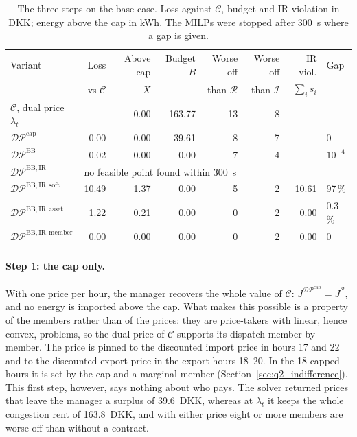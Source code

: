 \begin{table}[htbp]
\centering
\caption{The three steps on the base case. Loss against $\mathcal{C}$, budget and IR violation in DKK; energy above the cap in kWh. The MILPs were stopped after 300~s where a gap is given.}
\label{tab:DP_steps}
\small
\begin{tabular}{@{}lrrrrrrl@{}}
\toprule
Variant & Loss & Above cap & Budget $B$ & Worse off & Worse off & IR viol. & Gap\\
 & vs $\mathcal{C}$ & $X$ & & than $\mathcal{R}$ & than $\mathcal{I}$ & $\sum_is_i$ & \\
\midrule
$\mathcal{C}$, dual price $\lambda_t$ & -- & 0.00 & 163.77 & 13 & 8 & -- & --\\
$\mathcal{DP}^{\mathrm{cap}}$ & 0.00 & 0.00 & 39.61 & 8 & 7 & -- & 0\\
$\mathcal{DP}^{\mathrm{BB}}$ & 0.02 & 0.00 & 0.00 & 7 & 4 & -- & $10^{-4}$\\
$\mathcal{DP}^{\mathrm{BB,IR}}$ & \multicolumn{7}{l}{no feasible point found within 300~s}\\
$\mathcal{DP}^{\mathrm{BB,IR,soft}}$ & 10.49 & 1.37 & 0.00 & 5 & 2 & 10.61 & 97\,\%\\
$\mathcal{DP}^{\mathrm{BB,IR,asset}}$ & 1.22 & 0.21 & 0.00 & 0 & 2 & 0.00 & 0.3\,\%\\
$\mathcal{DP}^{\mathrm{BB,IR,member}}$ & 0.00 & 0.00 & 0.00 & 0 & 2 & 0.00 & 0\\
\bottomrule
\end{tabular}
\end{table}

\paragraph{Step 1: the cap only.}
With one price per hour, the manager recovers the whole value of $\mathcal{C}$: $J^{\mathcal{DP}^{\mathrm{cap}}}=J^{\mathcal{C}}$, and no energy is imported above the cap.
What makes this possible is a property of the members rather than of the prices: they are price-takers with linear, hence convex, problems, so the dual price of $\mathcal{C}$ supports its dispatch member by member.
The price is pinned to the discounted import price in hours 17 and 22 and to the discounted export price in the export hours 18--20.
In the 18 capped hours it is set by the cap and a marginal member (Section~\ref{sec:q2_indifference}).
This first step, however, says nothing about who pays.
The solver returned prices that leave the manager a surplus of 39.6~DKK, whereas at $\lambda_t$ it keeps the whole congestion rent of 163.8~DKK, and with either price eight or more members are worse off than without a contract.


